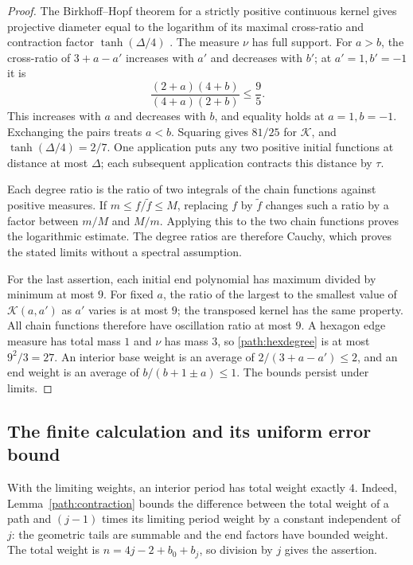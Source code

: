 \begin{proof}
The Birkhoff--Hopf theorem for a strictly positive continuous kernel gives
projective diameter equal to the logarithm of its maximal cross-ratio and
contraction factor $\tanh(\Delta/4)$
\cite[Theorems 3.5 and 6.3]{EvesonNussbaum1995}.
The measure $\nu$ has full support. For $a>b$, the cross-ratio of
$3+a-a'$ increases with $a'$ and decreases with $b'$; at $a'=1,b'=-1$ it is
\[
 \frac{(2+a)(4+b)}{(4+a)(2+b)}\le\frac95.
\]
This increases with $a$ and decreases with $b$, and equality holds at
$a=1,b=-1$. Exchanging the pairs treats $a<b$. Squaring gives $81/25$
for $\mathcal K$, and $\tanh(\Delta/4)=2/7$. One application puts any two
positive initial functions at distance at most $\Delta$; each subsequent
application contracts this distance by $\tau$.

Each degree ratio is the ratio of two integrals of the chain functions
against positive measures. If $m\le f/\widetilde f\le M$, replacing $f$
by $\widetilde f$ changes such a ratio by a factor between $m/M$ and $M/m$.
Applying this to the two chain functions proves the logarithmic estimate.
The degree ratios are therefore Cauchy, which proves the stated limits
without a spectral assumption.

For the last assertion, each initial end polynomial has maximum divided by
minimum at most $9$. For fixed $a$, the ratio of the largest to the smallest
value of $\mathcal K(a,a')$ as $a'$ varies is at most $9$; the transposed
kernel has the same property. All chain functions therefore have oscillation
ratio at most $9$. A hexagon edge measure has total mass $1$ and $\nu$ has
mass $3$, so \eqref{path:hexdegree} is at most $9^2/3=27$. An interior
base weight is an average of $2/(3+a-a')\le2$, and an end weight is an
average of $b/(b+1\pm a)\le1$. The bounds persist under limits.
\end{proof}

\subsection{The finite calculation and its uniform error bound}
With the limiting weights, an interior period has total weight exactly $4$.
Indeed, Lemma~\ref{path:contraction} bounds the difference between the total
weight of a path and $(j-1)$ times its limiting period weight by a constant
independent of $j$: the geometric tails are summable and the end factors
have bounded weight. The total weight is $n=4j-2+b_0+b_j$, so division by
$j$ gives the assertion.

